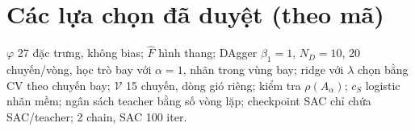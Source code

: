 \documentclass[11pt]{article}
\newcommand{\cS}{c_{S}}
\begin{document}
\section{Các lựa chọn đã duyệt (theo mã)}
$\varphi$ 27 đặc trưng, không bias; $\hat F$ hình thang; DAgger $\beta_1{=}1$, $N_D{=}10$, 20 chuyến/vòng, học trò bay với
$\alpha{=}1$, nhãn trong vùng bay; ridge với $\lambda$ chọn bằng CV theo chuyến bay; $\mathcal V$ 15 chuyến, dòng gió riêng;
kiểm tra $\rho(A_\alpha)$; $\cS$ logistic nhãn mềm; ngân sách teacher bằng số vòng lặp; checkpoint SAC chỉ chứa SAC/teacher;
2 chain, SAC 100 iter.
\end{document}
